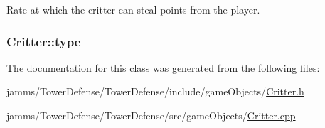 Rate at which the critter can steal points from the player. 

\hypertarget{class_critter_ac59fc8262aaffbdae6f2823460b58737}{
\subsubsection[{type}]{ Critter\+::type\hspace{0.3cm}{\ttfamily [protected]}}}\label{class_critter_ac59fc8262aaffbdae6f2823460b58737}


The documentation for this class was generated from the following files\+:\begin{DoxyCompactItemize}
\item 
jamms/\+Tower\+Defense/\+Tower\+Defense/include/game\+Objects/\hyperlink{_critter_8h}{Critter.\+h}\item 
jamms/\+Tower\+Defense/\+Tower\+Defense/src/game\+Objects/\hyperlink{_critter_8cpp}{Critter.\+cpp}\end{DoxyCompactItemize}
